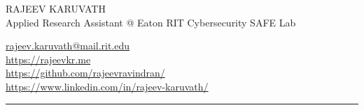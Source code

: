 \documentclass[letterpaper]{deedy-resume} %
\begin{document}

\begin{minipage}[t]{0.50\textwidth}

\begin{flushleft}
\Huge{}\uppercase{Rajeev Karuvath} \\
\sectionspace
\small{Applied Research Assistant @ Eaton RIT Cybersecurity SAFE Lab}
\end{flushleft}

\end{minipage}
\begin{minipage}[t]{0.40\textwidth}
\begin{flushright}
\small
\href{mailto:rk3824@rit.edu}{rajeev.karuvath@mail.rit.edu}  \faEnvelope \\
\url{https://rajeevkr.me}  \faChrome \\
\url{https://github.com/rajeevravindran/}  \faGithub  \\
\url{https://www.linkedin.com/in/rajeev-karuvath/}  \faLinkedin  \\

\end{flushright}
\end{minipage}
\sectionspace
\begin{hline}
\noindent\rule{\textwidth}{1pt}
\end{hline}

\end{document}
